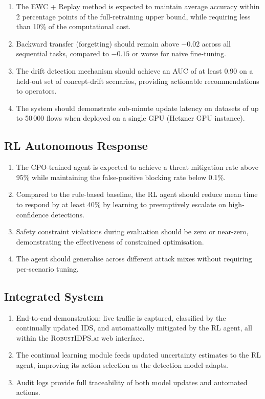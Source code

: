 \documentclass[12pt,a4paper]{article}
\newcommand{\RobustIDPS}{\textsc{RobustIDPS.ai}}
\theoremstyle{definition}
\begin{document}
\begin{enumerate}
\item The EWC + Replay method is expected to maintain average accuracy within 2 percentage points of the full-retraining upper bound, while requiring less than 10\% of the computational cost.
\item Backward transfer (forgetting) should remain above $-0.02$ across all sequential tasks, compared to $-0.15$ or worse for naive fine-tuning.
\item The drift detection mechanism should achieve an AUC of at least 0.90 on a held-out set of concept-drift scenarios, providing actionable recommendations to operators.
\item The system should demonstrate sub-minute update latency on datasets of up to 50\,000 flows when deployed on a single GPU (Hetzner GPU instance).
\end{enumerate}

\subsection{RL Autonomous Response}

\begin{enumerate}
\item The CPO-trained agent is expected to achieve a threat mitigation rate above 95\% while maintaining the false-positive blocking rate below 0.1\%.
\item Compared to the rule-based baseline, the RL agent should reduce mean time to respond by at least 40\% by learning to preemptively escalate on high-confidence detections.
\item Safety constraint violations during evaluation should be zero or near-zero, demonstrating the effectiveness of constrained optimisation.
\item The agent should generalise across different attack mixes without requiring per-scenario tuning.
\end{enumerate}

\subsection{Integrated System}

\begin{enumerate}
\item End-to-end demonstration: live traffic is captured, classified by the continually updated IDS, and automatically mitigated by the RL agent, all within the \RobustIDPS{} web interface.
\item The continual learning module feeds updated uncertainty estimates to the RL agent, improving its action selection as the detection model adapts.
\item Audit logs provide full traceability of both model updates and automated actions.
\end{enumerate}
\end{document}
